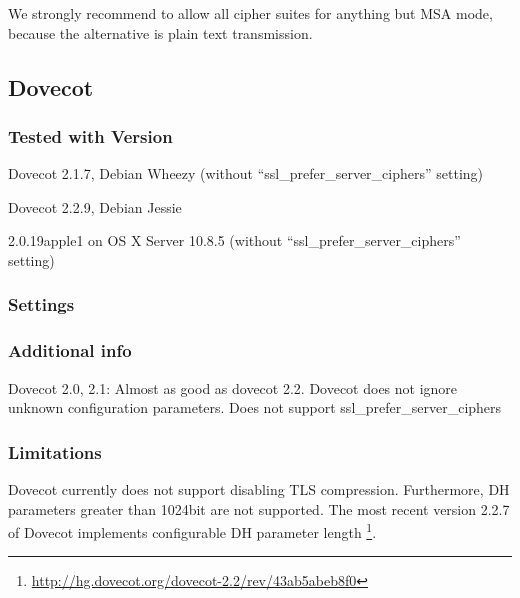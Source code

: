 
We strongly recommend to allow all cipher suites for anything but MSA
mode, because the alternative is plain text transmission.

\subsection{Dovecot}


\subsubsection{Tested with Version}
\begin{itemize*}
  \item Dovecot 2.1.7, Debian Wheezy (without ``ssl\_prefer\_server\_ciphers'' setting)
  \item Dovecot 2.2.9, Debian Jessie
  \item 2.0.19apple1 on OS X Server 10.8.5 (without ``ssl\_prefer\_server\_ciphers'' setting)
\end{itemize*}

\subsubsection{Settings}


\subsubsection{Additional info}
Dovecot 2.0, 2.1: Almost as good as dovecot 2.2. Dovecot does not ignore unknown configuration parameters. Does not support
ssl\_prefer\_server\_ciphers

\subsubsection{Limitations}
Dovecot currently does not support disabling TLS compression. Furthermore, DH
parameters greater than 1024bit are not supported. The most recent version
2.2.7 of Dovecot implements configurable DH parameter length
\footnote{\url{http://hg.dovecot.org/dovecot-2.2/rev/43ab5abeb8f0}}.

